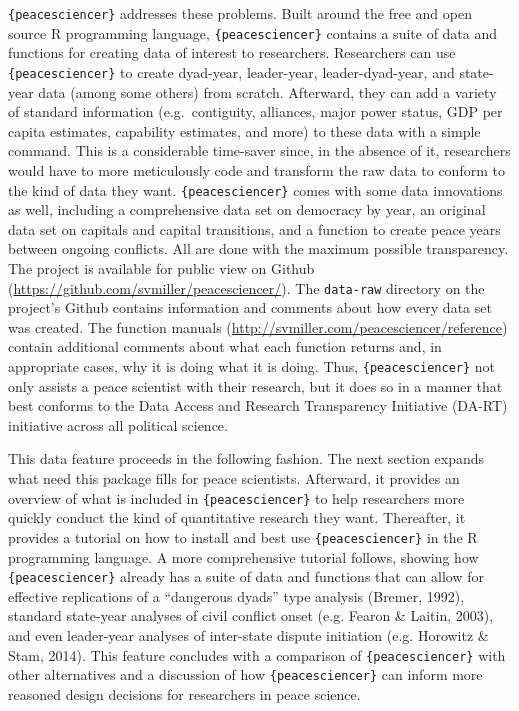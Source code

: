 \documentclass[
  11pt,
]{article}
\begin{document}
\texttt{\{peacesciencer\}} addresses these problems. Built around the free and open source R programming language, \texttt{\{peacesciencer\}} contains a suite of data and functions for creating data of interest to researchers. Researchers can use \texttt{\{peacesciencer\}} to create dyad-year, leader-year, leader-dyad-year, and state-year data (among some others) from scratch. Afterward, they can add a variety of standard information (e.g.~contiguity, alliances, major power status, GDP per capita estimates, capability estimates, and more) to these data with a simple command. This is a considerable time-saver since, in the absence of it, researchers would have to more meticulously code and transform the raw data to conform to the kind of data they want. \texttt{\{peacesciencer\}} comes with some data innovations as well, including a comprehensive data set on democracy by year, an original data set on capitals and capital transitions, and a function to create peace years between ongoing conflicts. All are done with the maximum possible transparency. The project is available for public view on Github (\url{https://github.com/svmiller/peacesciencer/}). The \texttt{data-raw} directory on the project's Github contains information and comments about how every data set was created. The function manuals (\url{http://svmiller.com/peacesciencer/reference}) contain additional comments about what each function returns and, in appropriate cases, why it is doing what it is doing. Thus, \texttt{\{peacesciencer\}} not only assists a peace scientist with their research, but it does so in a manner that best conforms to the Data Access and Research Transparency Initiative (DA-RT) initiative across all political science.

This data feature proceeds in the following fashion. The next section expands what need this package fills for peace scientists. Afterward, it provides an overview of what is included in \texttt{\{peacesciencer\}} to help researchers more quickly conduct the kind of quantitative research they want. Thereafter, it provides a tutorial on how to install and best use \texttt{\{peacesciencer\}} in the R programming language. A more comprehensive tutorial follows, showing how \texttt{\{peacesciencer\}} already has a suite of data and functions that can allow for effective replications of a ``dangerous dyads'' type analysis (Bremer, 1992), standard state-year analyses of civil conflict onset (e.g. Fearon \& Laitin, 2003), and even leader-year analyses of inter-state dispute initiation (e.g. Horowitz \& Stam, 2014). This feature concludes with a comparison of \texttt{\{peacesciencer\}} with other alternatives and a discussion of how \texttt{\{peacesciencer\}} can inform more reasoned design decisions for researchers in peace science.
\end{document}
